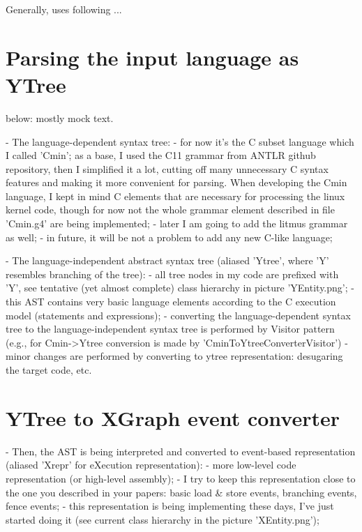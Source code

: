 Generally, \porthos[2] uses following  ...

\section{Parsing the input language as YTree}
\label{ch:impl:ytree}

below: mostly mock text.

- The language-dependent syntax tree:
        - for now it's the C subset language which I called 'Cmin'; as a base, I used the C11 grammar from ANTLR github repository, then I simplified it a lot, cutting off many unnecessary C syntax features and making it more convenient for parsing. When developing the Cmin language, I kept in mind C elements that are necessary for processing the linux kernel code, though for now not the whole grammar element described in file 'Cmin.g4' are being implemented;
        - later I am going to add the litmus grammar as well;
        - in future, it will be not a problem to add any new C-like language;

- The language-independent abstract syntax tree (aliased 'Ytree', where 'Y' resembles branching of the tree):
        - all tree nodes in my code are prefixed with 'Y', see tentative (yet almost complete) class hierarchy in picture 'YEntity.png';
        - this AST contains very basic language elements according to the C execution model (statements and expressions);
        - converting the language-dependent syntax tree to the language-independent syntax tree is performed by Visitor pattern (e.g., for Cmin->Ytree conversion is made by 'CminToYtreeConverterVisitor')
        - minor changes are performed by converting to ytree representation: desugaring the target code, etc.


\section{YTree to XGraph event converter}
\label{ch:impl:x2y}

- Then, the AST is being interpreted and converted to event-based representation (aliased 'Xrepr' for eXecution representation):
        - more low-level code representation (or high-level assembly);
        - I try to keep this representation close to the one you described in your papers: basic load \& store events, branching events, fence events;
        - this representation is being implementing these days, I've just started doing it (see current class hierarchy in the picture 'XEntity.png');
        
